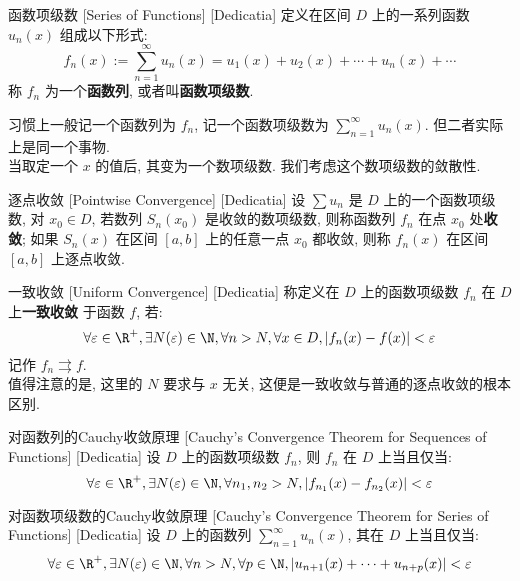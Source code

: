 \documentclass[UTF8]{ctexart}
\begin{document}
        \begin{dfn}
            [UUID]
            {函数项级数}
            [Series of Functions]
            [Dedicatia]
            定义在区间 \(D\) 上的一系列函数 \(u_n(x)\) 组成以下形式: \[f_n(x):=\sum_{n = 1}^{\infty} u_n(x)=u_1(x)+u_2(x)+\cdots+u_n(x)+\cdots \]
            称 \(f_n\) 为一个\textbf{函数列}, 或者叫\textbf{函数项级数}. 
        \end{dfn}

        习惯上一般记一个函数列为 \(f_n\), 记一个函数项级数为 \(\sum_{n = 1}^{\infty} u_n(x) \). 但二者实际上是同一个事物. \\
        当取定一个 \(x\) 的值后, 其变为一个数项级数. 我们考虑这个数项级数的敛散性. 
        
        \begin{dfn}
            [UUID]
            {逐点收敛}
            [Pointwise Convergence]
            [Dedicatia]
            设 \(\sum u_n\) 是 \(D\) 上的一个函数项级数, 对 \(x_0\in D\), 若数列 \(S_n(x_0)\) 是收敛的数项级数, 则称函数列 \(f_n\) 在点 \(x_0\) 处\textbf{收敛}; 如果 \(S_n(x)\) 在区间 \([a,b]\) 上的任意一点 \(x_0\) 都收敛, 则称 \(f_n(x)\) 在区间 \([a,b]\) 上逐点收敛. 
        \end{dfn}

        \begin{dfn}
            [UniformConvergence]
            {一致收敛}
            [Uniform Convergence]
            [Dedicatia]
            称定义在 \(D\) 上的函数项级数 \(f_n\) 在 \(D\) 上\textbf{一致收敛} 于函数 \(f\), 若: 
            \[\forall\varepsilon\in\R^+, \exists N(\varepsilon)\in\N, \forall n>N, \forall x\in D, |f_n(x)-f(x)|<\varepsilon\]
            记作 \(f_n\rightrightarrows f\).\\
            值得注意的是, 这里的 \(N\) 要求与 \(x\) 无关, 这便是一致收敛与普通的逐点收敛的根本区别. 
        \end{dfn}

        \begin{crl}
            [UUID]
            {对函数列的Cauchy收敛原理}
            [Cauchy's Convergence Theorem for Sequences of Functions]
            [Dedicatia]
            设 \(D\) 上的函数项级数 \(f_n\), 则 \(f_n\) 在 \(D\) 上 当且仅当: 
            \[\forall\varepsilon\in\R^+, \exists N(\varepsilon)\in\N, \forall n_1,n_2>N, |f_{n_1}(x)-f_{n_2}(x)|<\varepsilon\]
        \end{crl}

        \begin{crl}
            [UUID]
            {对函数项级数的Cauchy收敛原理}
            [Cauchy's Convergence Theorem for Series of Functions]
            [Dedicatia]
            设 \(D\) 上的函数列 \(\sum_{n=1}^{\infty} u_n(x)\), 其在 \(D\) 上 当且仅当: 
            \[\forall\varepsilon\in\R^+, \exists N(\varepsilon)\in\N, \forall n>N, \forall p\in\N, |u_{n+1}(x)+\cdots+u_{n+p}(x)|<\varepsilon\]
        \end{crl}
\end{document}
